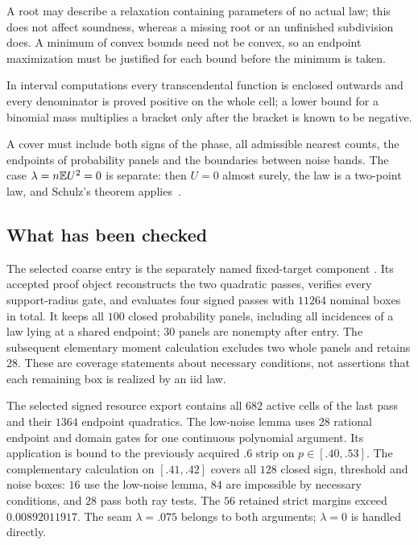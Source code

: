 A root may describe a relaxation containing parameters of no actual law;
this does not affect soundness, whereas a missing root or an unfinished
subdivision does. A minimum of convex bounds need not be convex, so an
endpoint maximization must be justified for each bound before the minimum
is taken.

In interval computations every transcendental function is enclosed
outwards and every denominator is proved positive on the whole cell; a
lower bound for a binomial mass multiplies a bracket only after the
bracket is known to be negative.

A cover must include both signs of the phase, all admissible nearest
counts, the endpoints of probability panels and the boundaries between
noise bands. The case $\lambda=n\mathbb E U^2=0$ is separate: then $U=0$ almost
surely, the law is a two-point law, and Schulz's theorem
applies~\cite{Schulz2016}.

\subsection{What has been checked}\label{v9:certificates:status}

The selected coarse entry is the separately named fixed-target component
. Its accepted proof object
reconstructs the two quadratic passes, verifies every support-radius gate,
and evaluates four signed passes with $11264$ nominal boxes in total.
It keeps all $100$ closed probability panels, including all incidences of
a law lying at a shared endpoint; $30$ panels are nonempty after entry.
The subsequent elementary moment calculation excludes two whole panels
and retains $28$. These are coverage statements about necessary conditions,
not assertions that each remaining box is realized by an iid law.

The selected signed resource export contains all $682$ active cells of
the last pass and their $1364$ endpoint quadratics. The low-noise lemma
uses $28$ rational endpoint and domain gates for one continuous polynomial
argument. Its application is bound to the previously acquired $.6$ strip
on $p\in[.40,.53]$. The complementary calculation on $[.41,.42]$ covers
all $128$ closed sign, threshold and noise boxes: $16$ use the low-noise
lemma, $84$ are impossible by necessary conditions, and $28$ pass both
ray tests. The $56$ retained strict margins exceed $0.00892011917$.
The seam $\lambda=.075$ belongs to both arguments; $\lambda=0$ is
handled directly.

